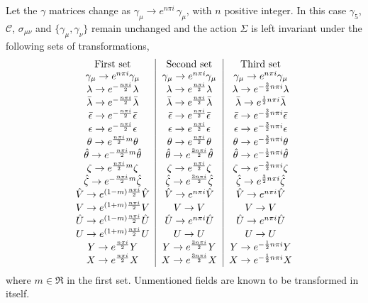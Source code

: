 \begin{appendix}
\noindent Let the $\gamma$ matrices change as $\gamma_{\mu}\to e^{n\pi i}\,\gamma_{\mu}$, with $n$ positive integer. In this case $\gamma_5$, $\mathcal{C}$, $\sigma_{\mu\nu}$ and $\{\gamma_{\mu},\gamma_{\nu}\}$ remain unchanged and the action $\Sigma$ is left invariant under the following sets of transformations,
\begin{equation}
\begin{tabular}{c|c|c}
First set&Second set&Third set\\
$\gamma_{\mu} \to e^{n\pi i} \gamma_{\mu}$&$\gamma_{\mu} \to e^{n\pi i}\gamma_{\mu}$&$\gamma_{\mu} \to e^{n\pi i}\gamma_{\mu}$\\
$\lambda \to e^{-\frac{n\pi i}{2}} \lambda$&$\lambda \to e^{\frac{n\pi i}{2}}\lambda$&$\lambda \to e^{-\frac{3}{2}n\pi i}\lambda$\\
$\bar{\lambda} \to e^{-\frac{n\pi i}{2}} \bar{\lambda}$&$\bar{\lambda} \to e^{\frac{n\pi i}{2}}\bar{\lambda}$&$\bar{\lambda} \to e^{\frac{1}{2}n\pi i}\bar{\lambda}$\\
$\bar{\epsilon} \to e^{-\frac{n\pi i}{2}} \bar{\epsilon}$&$\bar{\epsilon} \to e^{\frac{n\pi i}{2}} \bar{\epsilon}$&$\bar{\epsilon} \to 
e^{-\frac{3}{2}n\pi i} \bar{\epsilon}$\\
$\epsilon \to e^{-\frac{n\pi i}{2}} \epsilon$&$\epsilon \to e^{\frac{n\pi i}{2}}\epsilon$&$\epsilon \to e^{-\frac{3}{2}n\pi i}\epsilon$\\
$\theta \to e^{\frac{n\pi i}{2}m} \theta$&$\theta \to e^{\frac{n\pi i}{2}} \theta$&$\theta \to e^{-\frac{3}{2}n\pi i} \theta$\\
$\hat{\theta} \to e^{-\frac{n\pi i}{2}m} \hat{\theta}$&$\hat{\theta} \to e^{\frac{3 n\pi i}{2}} \hat{\theta}$&$\hat{\theta} \to 
e^{-\frac{1}{2} n\pi i} \hat{\theta}$\\
$\zeta \to e^{\frac{n\pi i}{2}m} \zeta$&$\zeta \to e^{\frac{n\pi i}{2}} \zeta$&$\zeta \to e^{-\frac{3}{2}n\pi i} \zeta$\\
$\hat{\zeta} \to e^{-\frac{n\pi i}{2}m} \hat{\zeta}$&$\hat{\zeta} \to e^{\frac{3n\pi i}{2}} \hat{\zeta}$&$\hat{\zeta} \to 
e^{\frac{3}{2}n\pi i} \hat{\zeta}$\\
$\hat{V} \to e^{(1-m)\frac{n\pi i}{2}} \hat{V}$&$\hat{V} \to e^{n\pi i} \hat{V}$&$\hat{V} \to e^{n\pi i} \hat{V}$\\
$V \to e^{(1+m)\frac{n\pi i}{2}} V $&$V \to V $&$V \to V$\\
$\hat{U} \to e^{(1-m)\frac{n\pi i}{2}} \hat{U}$&$\hat{U} \to e^{n\pi i} \hat{U}$&$\hat{U} \to e^{n\pi i} \hat{U}$\\
$U \to e^{(1+m)\frac{n\pi i}{2}} U$&$U \to  U$&$U \to U$\\
$Y \to e^{\frac{n\pi i}{2}} Y$&$Y \to e^{\frac{3n\pi i}{2}} Y$&$Y \to e^{-\frac{1}{2}n\pi i} Y$\\
$X \to e^{\frac{n\pi i}{2}} X$&$X \to e^{\frac{3n\pi i}{2}} X$&$X \to e^{-\frac{1}{2}n\pi i} X$
\end{tabular}
\end{equation}
where $m\in \Re$ in the first set. Unmentioned fields are known to be transformed in itself.


\end{appendix}

